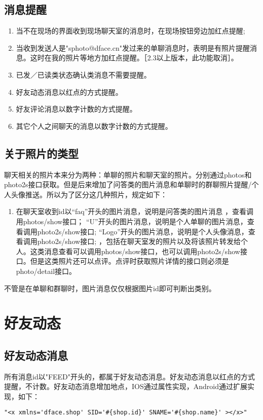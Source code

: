 \subsection{消息提醒}
\begin{enumerate}
\item 当不在现场的界面收到现场聊天室的消息时，在现场按钮旁边加红点提醒;
\item 当收到发送人是"sphoto@dface.cn"发过来的单聊消息时，表明是有照片提醒消息。这时在我的照片等地方加红点提醒。［2.3以上版本，此功能取消］。
\item 已发／已读类状态确认类消息不需要提醒。
\item 好友动态消息以红点的方式提醒。
\item 好友评论消息以数字计数的方式提醒。
\item 其它个人之间聊天的消息以数字计数的方式提醒。
\end{enumerate}


\subsection{关于照片的类型}
聊天相关的照片本来分为两种：单聊的照片和聊天室的照片。分别通过photos和photo2s接口获取。但是后来增加了问答类的图片消息和单聊时的群聊照片提醒/个人头像推送。所以为了区分这几种照片，规定如下：
\begin{enumerate}
\item 在聊天室收到id以“faq”开头的图片消息，说明是问答类的图片消息 ，查看调用photos/show接口；
“U”开头的图片消息，说明是个人单聊的图片消息，查看调用photo2s/show接口;
“Logo”开头的图片消息，说明是个人头像消息，查看调用photo2s/show接口;
，包括在聊天室发的照片以及将该照片转发给个人。这类消息查看可以调用photos/show接口，也可以调用photo2s/show接口。但是这类照片还可以点评。点评时获取照片详情的接口则必须是photo/detail接口。
\end{enumerate}

不管是在单聊和群聊时，图片消息仅仅根据图片id即可判断出类别。

\section{好友动态}
\subsection{好友动态消息}
所有消息id以"FEED"开头的，都属于好友动态消息。好友动态消息以红点的方式提醒，不计数。好友动态消息增加地点，IOS通过属性实现，Android通过扩展实现，如下：
\begin{verbatim}
"<x xmlns='dface.shop' SID='#{shop.id}' SNAME='#{shop.name}' ></x>"
\end{verbatim}


